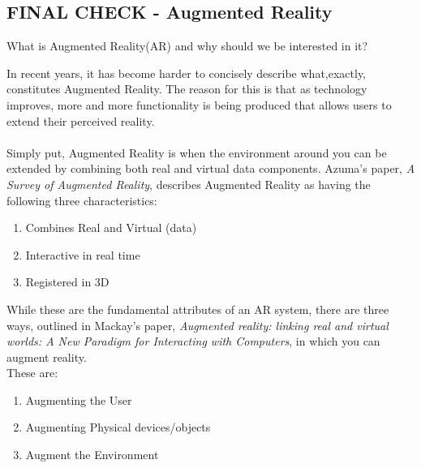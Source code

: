 \documentclass[11pt]{article}
\begin{document}
\subsection{FINAL CHECK - Augmented Reality}
\begin{center}
What is Augmented Reality(AR) and why should we be interested in it? \\
\end{center}
In recent years, it has become harder to concisely describe what,exactly, 
constitutes Augmented Reality. The reason for this is that as technology
improves, more and more functionality is being produced that allows 
users to extend their perceived reality.\\ 
\\
Simply put, Augmented Reality is when the environment around you can be 
extended by combining both real and virtual data components. Azuma's 
paper, \textit{A Survey of Augmented Reality}\cite{Azuma97},
describes Augmented Reality as having the following three characteristics:
\begin{enumerate}
	\item Combines Real and Virtual (data) 
	\item Interactive in real time
	\item Registered in 3D
\end{enumerate}

While these are the fundamental attributes of an AR system, there are 
three ways, outlined in Mackay's paper, 
\textit{Augmented reality: linking real and virtual worlds: 
A New Paradigm for Interacting with Computers}\cite{Mackay},
in which you can augment reality.\\
These are:
\begin{enumerate}
	\item Augmenting the User
	\item Augmenting Physical devices/objects
	\item Augment the Environment
\end{enumerate}
\end{document}
